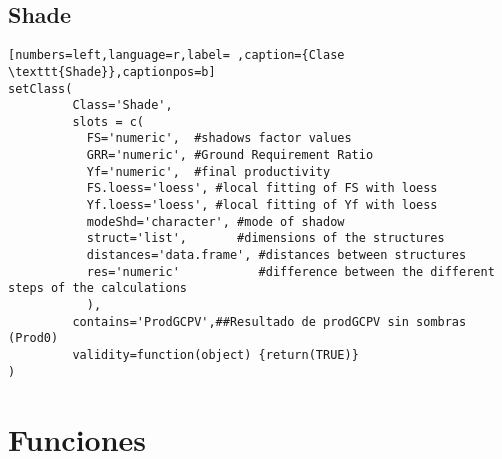 \subsection{Shade}
\label{sec:org8d743b4}
\begin{lstlisting}[numbers=left,language=r,label= ,caption={Clase \texttt{Shade}},captionpos=b]
setClass(
         Class='Shade',
         slots = c(
           FS='numeric',  #shadows factor values
           GRR='numeric', #Ground Requirement Ratio
           Yf='numeric',  #final productivity
           FS.loess='loess', #local fitting of FS with loess
           Yf.loess='loess', #local fitting of Yf with loess
           modeShd='character', #mode of shadow
           struct='list',       #dimensions of the structures
           distances='data.frame', #distances between structures
           res='numeric'           #difference between the different steps of the calculations
           ),
         contains='ProdGCPV',##Resultado de prodGCPV sin sombras (Prod0)
         validity=function(object) {return(TRUE)}
)
\end{lstlisting}
\section{Funciones}
\label{sec:org2cce384}
